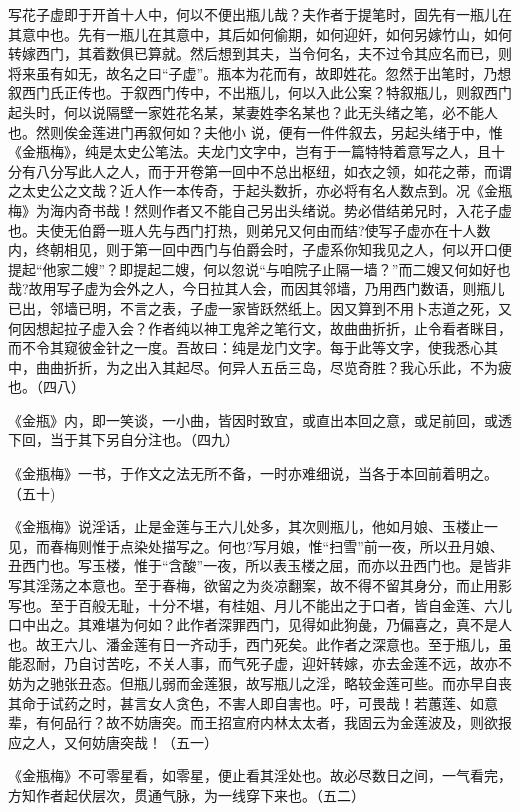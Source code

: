 \begin{showcontents}{}
{写花子虚即于开首十人中，何以不便出瓶儿哉？夫作者于提笔时，固先有一瓶儿在其意中也。先有一瓶儿在其意中，其后如何偷期，如何迎奸，如何另嫁竹山，如何转嫁西门，其着数俱已算就。然后想到其夫，当令何名，夫不过令其应名而已，则将来虽有如无，故名之曰“子虚”。瓶本为花而有，故即姓花。忽然于出笔时，乃想叙西门氏正传也。于叙西门传中，不出瓶儿，何以入此公案？特叙瓶儿，则叙西门起头时，何以说隔壁一家姓花名某，某妻姓李名某也？此无头绪之笔，必不能人也。然则俟金莲进门再叙何如？夫他小
说，便有一件件叙去，另起头绪于中，惟《金瓶梅》，纯是太史公笔法。夫龙门文字中，岂有于一篇特特着意写之人，且十分有八分写此人之人，而于开卷第一回中不总出枢纽，如衣之领，如花之蒂，而谓之太史公之文哉？近人作一本传奇，于起头数折，亦必将有名人数点到。况《金瓶梅》为海内奇书哉！然则作者又不能自己另出头绪说。势必借结弟兄时，入花子虚也。夫使无伯爵一班人先与西门打热，则弟兄又何由而结?使写子虚亦在十人数内，终朝相见，则于第一回中西门与伯爵会时，子虚系你知我见之人，何以开口便提起“他家二嫂”？即提起二嫂，何以忽说“与咱院子止隔一墙？”而二嫂又何如好也哉?故用写子虚为会外之人，今日拉其人会，而因其邻墙，乃用西门数语，则瓶儿已出，邻墙已明，不言之表，子虚一家皆跃然纸上。因又算到不用卜志道之死，又何因想起拉子虚入会？作者纯以神工鬼斧之笔行文，故曲曲折折，止令看者眯目，而不令其窥彼金针之一度。吾故曰：纯是龙门文字。每于此等文字，使我悉心其中，曲曲折折，为之出入其起尽。何异人五岳三岛，尽览奇胜？我心乐此，不为疲也。（四八）

《金瓶》内，即一笑谈，一小曲，皆因时致宜，或直出本回之意，或足前回，或透下回，当于其下另自分注也。（四九）

《金瓶梅》一书，于作文之法无所不备，一时亦难细说，当各于本回前着明之。（五十)

《金瓶梅》说淫话，止是金莲与王六儿处多，其次则瓶儿，他如月娘、玉楼止一见，而春梅则惟于点染处描写之。何也?写月娘，惟“扫雪”前一夜，所以丑月娘、丑西门也。写玉楼，惟于“含酸”一夜，所以表玉楼之屈，而亦以丑西门也。是皆非写其淫荡之本意也。至于春梅，欲留之为炎凉翻案，故不得不留其身分，而止用影写也。至于百般无耻，十分不堪，有桂姐、月儿不能出之于口者，皆自金莲、六儿口中出之。其难堪为何如？此作者深罪西门，见得如此狗彘，乃偏喜之，真不是人也。故王六儿、潘金莲有日一齐动手，西门死矣。此作者之深意也。至于瓶儿，虽能忍耐，乃自讨苦吃，不关人事，而气死子虚，迎奸转嫁，亦去金莲不远，故亦不妨为之驰张丑态。但瓶儿弱而金莲狠，故写瓶儿之淫，略较金莲可些。而亦早自丧其命于试药之时，甚言女人贪色，不害人即自害也。吁，可畏哉！若蕙莲、如意辈，有何品行？故不妨唐突。而王招宣府内林太太者，我固云为金莲波及，则欲报应之人，又何妨唐突哉！（五一）

《金瓶梅》不可零星看，如零星，便止看其淫处也。故必尽数日之间，一气看完，方知作者起伏层次，贯通气脉，为一线穿下来也。（五二）

}
\end{showcontents}
